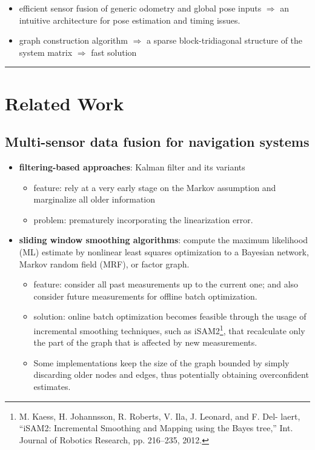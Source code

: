 \documentclass[letterpaper,11pt]{article}
\begin{document}
\begin{itemize}
	\item efficient sensor fusion of generic odometry and global pose inputs \(\Rightarrow\) an intuitive architecture for pose estimation and timing issues.
	\item graph construction algorithm \(\Rightarrow\) a sparse block-tridiagonal structure of the system matrix \(\Rightarrow\) fast solution
\end{itemize}

\begin{center}\rule{\textwidth}{1pt}\end{center}
\section{Related Work}

\subsection{Multi-sensor data fusion for navigation systems}

\begin{itemize}
	\item \textbf{filtering-based approaches}: Kalman filter and its variants
	\begin{itemize}
		\item feature: rely at a very early stage on the Markov assumption and marginalize all older information
		\item problem: prematurely incorporating the linearization error.
	\end{itemize}
	\item \textbf{sliding window smoothing algorithms}: compute the maximum likelihood (ML) estimate by nonlinear least squares optimization to a Bayesian network, Markov random field (MRF), or factor graph.
	\begin{itemize}
		\item feature: consider all past measurements up to the current one; and also consider future measurements for offline batch optimization.
		\item solution: online batch optimization becomes feasible through the usage of incremental smoothing techniques, such as iSAM2\footnote{M. Kaess, H. Johannsson, R. Roberts, V. Ila, J. Leonard, and F. Del- laert, “iSAM2: Incremental Smoothing and Mapping using the Bayes tree,” Int. Journal of Robotics Research, pp. 216–235, 2012.}, that recalculate only the part of the graph that is affected by new measurements.
		\item Some implementations keep the size of the graph bounded by simply discarding older nodes and edges, thus potentially obtaining overconfident estimates.
	\end{itemize}
\end{itemize}
\end{document}
